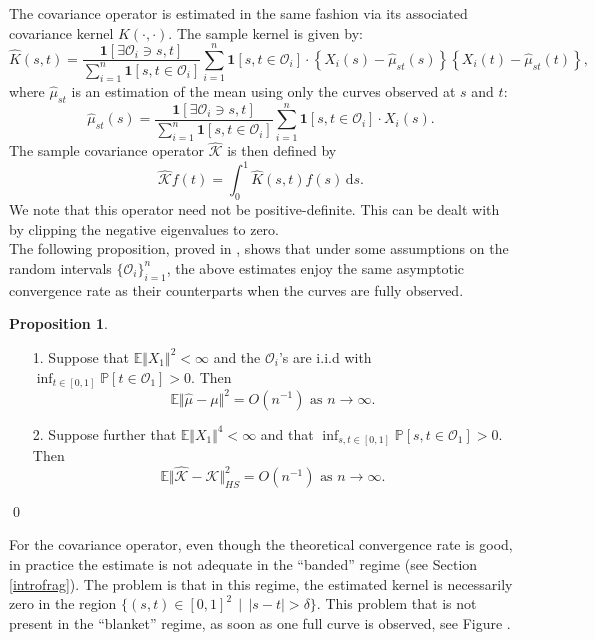 \documentclass[10pt, a4paper]{report}
\newcommand{\Pp}[0]{\mathbb{P}}
\theoremstyle{definition}
\newtheorem{prop}{Proposition}
\theoremstyle{remark}
\begin{document}
The covariance operator is estimated in the same fashion via its associated covariance kernel $K(\cdot,\cdot)$. The sample kernel is given by:
\begin{equation}\label{estcovfrag}
	\hat{K}(s,t) = \frac{\mathbf{1}[\exists \mathcal{O}_i \ni s,t ]}{\sum_{i=1}^n \mathbf{1}[s,t \in \mathcal{O}_i]} \sum_{i=1}^n \mathbf{1}[s,t \in \mathcal{O}_i] \cdot \left\{X_i(s)-\hat{\mu}_{st}(s)\right\}\left\{X_i(t)-\hat{\mu}_{st}(t)\right\},
\end{equation}
where  $\hat{\mu}_{st}$ is an estimation of the mean using only the curves observed at $s$ and $t$:
\[\hat{\mu}_{st}(s) = \frac{\mathbf{1}[\exists \mathcal{O}_i \ni s,t ]}{\sum_{i=1}^n \mathbf{1}[s,t \in \mathcal{O}_i]} \sum_{i=1}^n \mathbf{1}[s,t \in \mathcal{O}_i] \cdot X_i(s). \]
The sample covariance operator $\hat{\mathcal{K}}$ is then defined by 
\[\hat{\mathcal{K}}f(t) = \int_{0}^{1} \! \hat{K}(s,t)f(s) \, \mathrm{d}s.\]
We note that this operator need not be positive-definite. This can be dealt with by clipping the negative eigenvalues to zero.\\
The following proposition, proved in \cite[Prop. ]{Kraus1}, shows that under some assumptions on the random intervals $\{\mathcal{O}_i\}_{i=1}^n$, the above estimates enjoy the same asymptotic convergence rate as their counterparts when the curves are fully observed.
\begin{prop}
	\begin{itemize}
		\item[]
		\item[1.] Suppose that $\mathbb{E}\Vert X_1\Vert^2<\infty$ and the $\mathcal{O}_i$'s are i.i.d with $\inf_{t \in [0,1]} \Pp\left[t \in \mathcal{O}_1\right]>0$. Then 
		\[\mathbb{E}\Vert \hat{\mu}-\mu\Vert^2 = O(n^{-1}) \text{ as } n \to \infty. \]
		\item[2.] Suppose further that $\mathbb{E}\Vert X_1\Vert^4<\infty$ and that $\inf_{s,t \in [0,1]} \Pp\left[s,t \in \mathcal{O}_1\right]>0$. Then 
		\[\mathbb{E}\Vert \hat{\mathcal{K}}-\mathcal{K}\Vert^2_{HS} = O(n^{-1}) \text{ as } n \to \infty. \]
	\end{itemize}
	\qed
\end{prop}
For the covariance operator, even though the theoretical convergence rate is good, in practice the estimate is not adequate in the ``banded'' regime (see Section \ref{introfrag}). The problem is that in this regime, the estimated kernel is necessarily zero in the region $\{(s,t)\in [0,1]^2 \, \mid \, \vert s-t\vert > \delta \}$. This problem that is not present in the ``blanket'' regime, as soon as one full curve is observed, see Figure .
\end{document}
